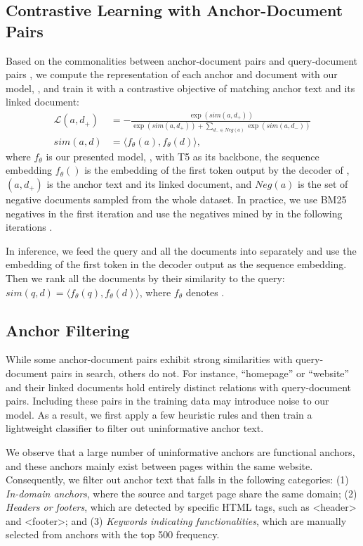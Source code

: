 \subsection{Contrastive Learning with Anchor-Document Pairs}
\label{sec:ad_pred}
Based on the commonalities between anchor-document pairs and query-document pairs \cite{AnchorAnalysis,Anchorcollaborative,AnchorContent,AnchorMining,AnchorStructure}, we compute the representation of each anchor and document with our model, \anchordrours, and train it with a contrastive objective of matching anchor text and its linked document:
\begin{align}
\mathcal{L}(a, d_{+})&=-\frac{\exp (sim(a, d_{+}) )}{\exp (sim(a, d_{+}) )+\sum_{d_{-}\in Neg (a)} \exp (sim(a, d_{-}) )} \\
sim(a, d)&=\langle f_\theta(a), f_\theta(d)\rangle,
\end{align}
where $f_\theta$ is our presented model, \anchordrours, with T5 \cite{T5} as its backbone, the sequence embedding $f_\theta()$ is the embedding of the first token output by the decoder of \anchordrours, $(a, d_{+})$ is the anchor text and its linked document, and $Neg (a)$ is the set of negative documents sampled from the whole dataset. 
In practice, we use BM25 negatives in the first iteration \cite{DPR} and use the negatives mined by \anchordrours in the following iterations \cite{ANCE}.

In inference, we feed the query and all the documents into \anchordrours separately and use the embedding of the first token in the decoder output as the sequence embedding.
Then we rank all the documents by their similarity to the query: $sim(q, d)=\langle f_\theta(q), f_\theta(d)\rangle$, where $f_{\theta}$ denotes \anchordrours.

\subsection{Anchor Filtering}
\label{sec:filtering}
While some anchor-document pairs exhibit strong similarities with query-document pairs in search, others do not.
For instance, ``homepage'' or ``website'' and their linked documents hold entirely distinct relations with query-document pairs.
Including these pairs in the training data may introduce noise to our model.
As a result, we first apply a few heuristic rules and then train a lightweight classifier to filter out uninformative anchor text.

We observe that a large number of uninformative anchors are functional anchors, and these anchors mainly exist between pages within the same website. 
Consequently, we filter out anchor text that falls in the following categories: 
(1) \textit{In-domain anchors}, where the source and target page share the same domain; 
(2) \textit{Headers or footers}, which are detected by specific HTML tags, such as <header> and <footer>; and 
(3) \textit{Keywords indicating functionalities}, which are manually selected from anchors with the top 500 frequency.

